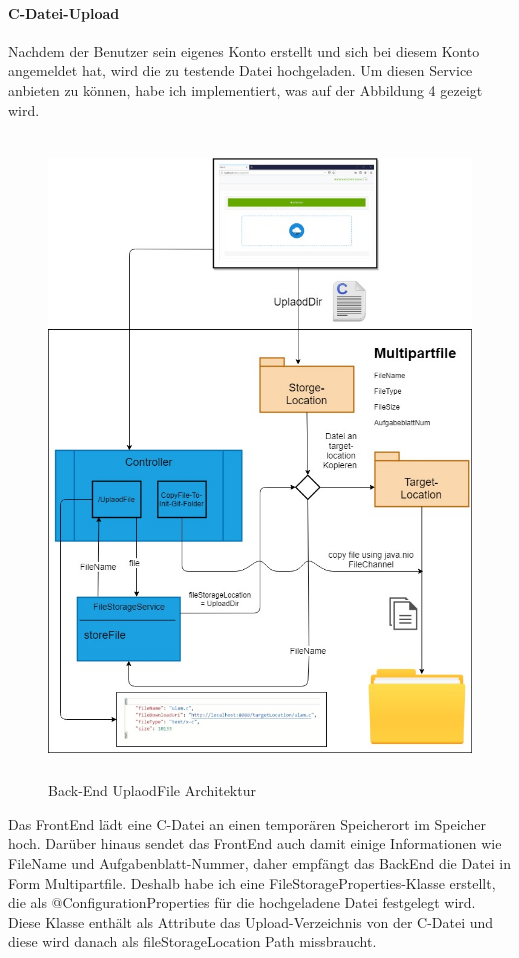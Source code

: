 \documentclass[apaper4,12p]{scrartcl}
\begin{document}
\paragraph{C-Datei-Upload}
Nachdem der Benutzer sein eigenes Konto erstellt und sich bei diesem Konto angemeldet hat, wird die zu testende Datei hochgeladen. Um diesen Service anbieten zu können, habe ich implementiert, was auf der Abbildung 4 gezeigt wird.
\begin{figure}[h!]
	\begin{center}
		\includegraphics[width=17cm, height=17cm]{UplaodFileArchi.jpg}
		\caption{Back-End UplaodFile Architektur} 
		\label{Back-End UplaodFile Architektur} 
	\end{center}
\end{figure}
\newline
Das FrontEnd lädt eine C-Datei an einen temporären Speicherort im Speicher hoch. Darüber hinaus sendet das FrontEnd auch damit einige Informationen wie FileName und Aufgabenblatt-Nummer, daher empfängt das BackEnd die Datei in Form Multipartfile. Deshalb habe ich eine FileStorageProperties-Klasse erstellt, die als @ConfigurationProperties für die hochgeladene Datei festgelegt wird. Diese Klasse enthält als Attribute das Upload-Verzeichnis von der C-Datei und diese wird danach als fileStorageLocation Path missbraucht.
\end{document}
